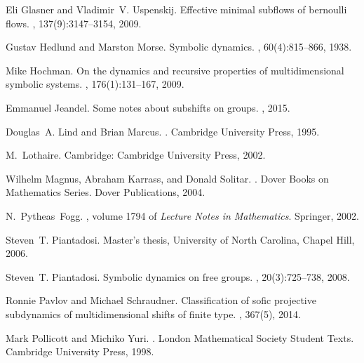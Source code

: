 \documentclass[letterpaper]{article}
\theoremstyle{plain}
\begin{document}
\begin{thebibliography}{10}
		Eli Glasner and Vladimir~V. Uspenskij.
		\newblock Effective minimal subflows of bernoulli flows.
		, 137(9):3147--3154, 2009.
		
		Gustav Hedlund and Marston Morse.
		\newblock Symbolic dynamics.
		, 60(4):815--866, 1938.
		
		Mike Hochman.
		\newblock On the dynamics and recursive properties of multidimensional symbolic
		systems.
		, 176(1):131--167, 2009.
		
		Emmanuel Jeandel.
		\newblock Some notes about subshifts on groups.
		, 2015.
		
		Douglas~A. Lind and Brian Marcus.
		.
		\newblock Cambridge University Press, 1995.
		
		M.~{Lothaire}.
		\newblock Cambridge: Cambridge University Press, 2002.
		
		Wilhelm Magnus, Abraham Karrass, and Donald Solitar.
		.
		\newblock Dover Books on Mathematics Series. Dover Publications, 2004.
		
		N.~Pytheas~Fogg.
		,
		volume 1794 of {\em Lecture Notes in Mathematics}.
		\newblock Springer, 2002.
		
		Steven~T. Piantadosi.
		\newblock Master's thesis, {University of North Carolina, Chapel Hill}, 2006.
		
		Steven~T. Piantadosi.
		\newblock Symbolic dynamics on free groups.
		, 20(3):725--738,
		2008.
		
		Ronnie Pavlov and Michael Schraudner.
		\newblock Classification of sofic projective subdynamics of multidimensional
		shifts of finite type.
		, 367(5),
		2014.
		
		Mark Pollicott and Michiko Yuri.
		.
		\newblock London Mathematical Society Student Texts. Cambridge University
		Press, 1998.
		
	\end{thebibliography}
	
	
	
\end{document}
